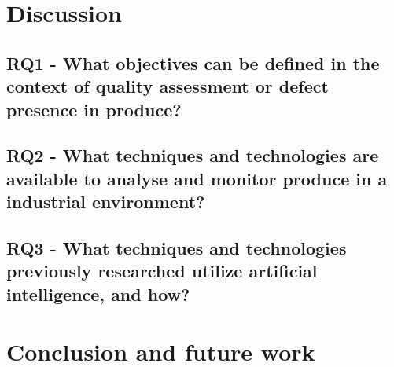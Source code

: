 \documentclass[conference]{IEEEtran}
\begin{document}
\section{Discussion}
\label{sec:disc}

\subsection{RQ1 - What objectives can be defined in the context of quality assessment or defect presence in produce?}

\subsection{RQ2 - What techniques and technologies are available to analyse and monitor produce in a industrial environment?}

\subsection{RQ3 - What techniques and technologies previously researched utilize artificial intelligence, and how?}

\section{Conclusion and future work}
\label{sec:conc}



\end{document}
